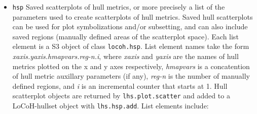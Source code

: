 \documentclass{article}
\begin{document}
\begin{itemize}
  \item \texttt{hsp} Saved scatterplots of hull metrics, or more precisely a list of the parameters used to create  scatterplots of hull metrics. Saved hull scatterplots can be used for plot symbolizations and/or subsetting, and can also include saved regions (manually defined areas of the scatterplot space). Each list element is a S3 object of class \texttt{locoh.hsp}. List element names take the form \textit{xaxis.yaxis.hmapvars.reg-n.i}, where \textit{xaxis} and \textit{yaxis} are the names of hull metrics plotted on the x and y axes respectively, \textit{hmapvars} is a concatention of hull metric auxillary parameters (if any), \textit{reg-n} is the number of manually defined regions, and \textit{i} is an incremental counter that starts at 1. Hull scatterplot objects are returned by \texttt{lhs.plot.scatter} and added to a LoCoH-hullset object with \texttt{lhs.hsp.add}. List elements include:
  

\end{itemize}
\end{document}
